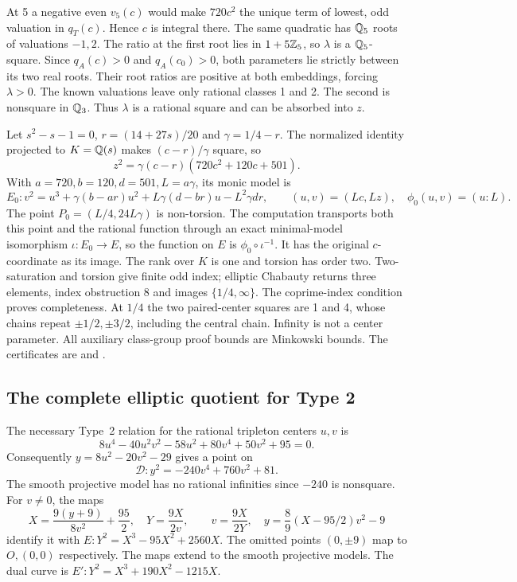 At 5 a negative even $v_5(c)$ would make $720c^2$ the unique term
of lowest, odd valuation in $q_T(c)$. Hence $c$ is integral there.
The same quadratic has $\mathbb Q_5$ roots of valuations $-1,2$.
The ratio at the first root lies in $1+5\mathbb Z_5$, so
$\lambda$ is a $\mathbb Q_5$-square. Since $q_A(c)>0$ and
$q_A(c_0)>0$, both parameters lie strictly between its two real
roots. Their root ratios are positive at both embeddings, forcing
$\lambda>0$. The known valuations leave only rational classes 1
and 2. The second is nonsquare in $\mathbb Q_3$. Thus $\lambda$
is a rational square and can be absorbed into $z$.

Let $s^2-s-1=0$, $r=(14+27s)/20$ and $\gamma=1/4-r$.
The normalized identity projected to $K=\mathbb Q(s)$ makes
$(c-r)/\gamma$ square, so
\[
 z^2=\gamma(c-r)(720c^2+120c+501).
\]
With $a=720,b=120,d=501,L=a\gamma$, its monic model is
\[
 E_0:v^2=u^3+\gamma(b-ar)u^2+L\gamma(d-br)u-L^2\gamma dr,
 \qquad(u,v)=(Lc,Lz),\quad\phi_0(u,v)=(u:L).
\]
The point $P_0=(L/4,24L\gamma)$ is non-torsion. The computation
transports both this point and the rational function through an exact
minimal-model isomorphism $\iota:E_0\to E$, so the function on $E$
is $\phi_0\circ\iota^{-1}$. It has the original $c$-coordinate as
its image. The rank over $K$ is one and torsion has order two.
Two-saturation and torsion give finite odd index; elliptic Chabauty
returns three elements, index obstruction 8 and images
$\{1/4,\infty\}$. The coprime-index condition proves completeness.
At $1/4$ the two paired-center squares are 1 and 4, whose chains
repeat $\pm1/2,\pm3/2$, including the central chain. Infinity is
not a center parameter. All auxiliary class-group proof bounds are
Minkowski bounds. The certificates are
 and
.

\subsection{The complete elliptic quotient for Type 2}\label{detail:type2}
The necessary Type~2 relation for the rational tripleton centers $u,v$ is
\[
 8u^4-40u^2v^2-58u^2+80v^4+50v^2+95=0.
\]
Consequently $y=8u^2-20v^2-29$ gives a point on
\[
 \mathcal D:y^2=-240v^4+760v^2+81.
\]
The smooth projective model has no rational infinities since $-240$
is nonsquare. For $v\ne0$, the maps
\[
 X=\frac{9(y+9)}{8v^2}+\frac{95}{2},\quad Y=\frac{9X}{2v},
 \qquad v=\frac{9X}{2Y},\quad
 y=\frac89(X-95/2)v^2-9
\]
identify it with $E:Y^2=X^3-95X^2+2560X$.
The omitted points $(0,\pm9)$ map to $O,(0,0)$ respectively.
The maps extend to the smooth projective models.
The dual curve is $E':Y^2=X^3+190X^2-1215X$.

